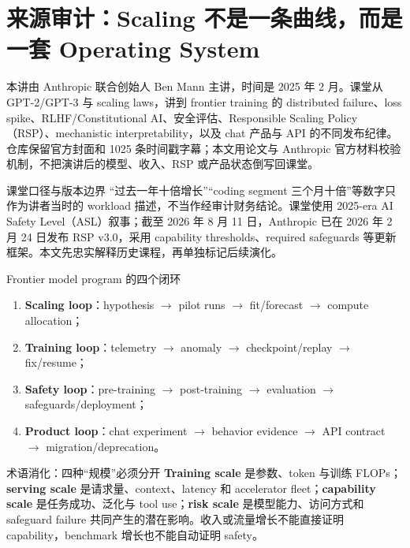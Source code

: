 \section{来源审计：Scaling 不是一条曲线，而是一套 Operating System}

本讲由 Anthropic 联合创始人 Ben Mann 主讲，时间是 2025 年 2 月。课堂从 GPT-2/GPT-3 与 scaling laws，讲到 frontier training 的 distributed failure、loss spike、RLHF/Constitutional AI、安全评估、Responsible Scaling Policy（RSP）、mechanistic interpretability，以及 chat 产品与 API 的不同发布纪律。仓库保留官方封面和 1025 条时间戳字幕；本文用论文与 Anthropic 官方材料校验机制，不把演讲后的模型、收入、RSP 或产品状态倒写回课堂。

\begin{warningbox}{课堂口径与版本边界}
“过去一年十倍增长”“coding segment 三个月十倍”等数字只作为讲者当时的 workload 描述，不当作经审计财务结论。课堂使用 2025-era AI Safety Level（ASL）叙事；截至 2026 年 8 月 11 日，Anthropic 已在 2026 年 2 月 24 日发布 RSP v3.0，采用 capability thresholds、required safeguards 等更新框架。本文先忠实解释历史课程，再单独标记后续演化。
\end{warningbox}

\begin{importantbox}{Frontier model program 的四个闭环}
\begin{enumerate}
  \item \textbf{Scaling loop}：hypothesis $\rightarrow$ pilot runs $\rightarrow$ fit/forecast $\rightarrow$ compute allocation；
  \item \textbf{Training loop}：telemetry $\rightarrow$ anomaly $\rightarrow$ checkpoint/replay $\rightarrow$ fix/resume；
  \item \textbf{Safety loop}：pre-training $\rightarrow$ post-training $\rightarrow$ evaluation $\rightarrow$ safeguards/deployment；
  \item \textbf{Product loop}：chat experiment $\rightarrow$ behavior evidence $\rightarrow$ API contract $\rightarrow$ migration/deprecation。
\end{enumerate}
\end{importantbox}

\begin{knowledgebox}{术语消化：四种“规模”必须分开}
\textbf{Training scale} 是参数、token 与训练 FLOPs；\textbf{serving scale} 是请求量、context、latency 和 accelerator fleet；\textbf{capability scale} 是任务成功、泛化与 tool use；\textbf{risk scale} 是模型能力、访问方式和 safeguard failure 共同产生的潜在影响。收入或流量增长不能直接证明 capability，benchmark 增长也不能自动证明 safety。
\end{knowledgebox}

